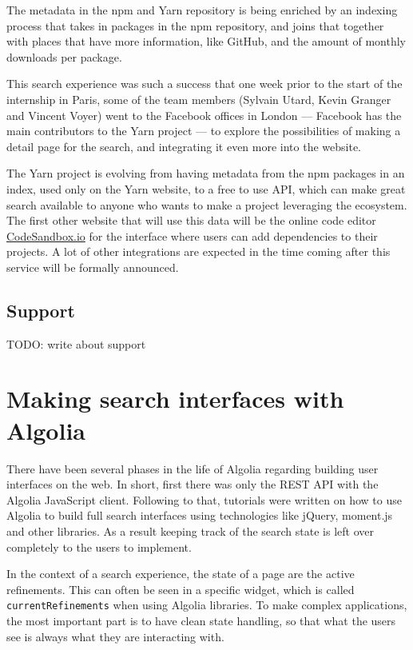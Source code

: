 The metadata in the npm and Yarn repository is being enriched by an indexing process\cite{npm-search} that takes in packages in the npm repository, and joins that together with places that have more information, like GitHub, and the amount of monthly downloads per package.

This search experience was such a success that one week prior to the start of the internship in Paris, some of the team members (Sylvain Utard, Kevin Granger and Vincent Voyer) went to the Facebook offices in London --- Facebook has the main contributors to the Yarn project --- to explore the possibilities of making a detail page for the search, and integrating it even more into the website.

The Yarn project is evolving from having metadata from the npm packages in an index, used only on the Yarn website, to a free to use API, which can make great search available to anyone who wants to make a project leveraging the ecosystem. The first other website that will use this data will be the online code editor \href{https://codesandbox.io}{CodeSandbox.io} for the interface where users can add dependencies to their projects. A lot of other integrations are expected in the time coming after this service will be formally announced.

\subsection{Support}
\label{support}

TODO: write about support%

\section{Making search interfaces with Algolia} %
\label{sec:making_search_interfaces_with_algolia}

There have been several phases in the life of Algolia regarding building user interfaces on the web. In short, first there was only the REST API with the Algolia JavaScript client. Following to that, tutorials were written on how to use Algolia to build full search interfaces using technologies like jQuery, moment.js and other libraries. As a result keeping track of the search state is left over completely to the users to implement. 

In the context of a search experience, the state of a page are the active refinements. This can often be seen in a specific widget, which is called {\tt currentRefinements} when using Algolia libraries. To make complex applications, the most important part is to have clean state handling, so that what the users see is always what they are interacting with.

